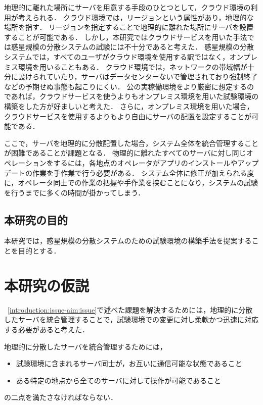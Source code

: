 地理的に離れた場所にサーバを用意する手段のひとつとして，クラウド環境の利用が考えられる．
クラウド環境では，リージョンという属性があり，地理的な場所を指す．
リージョンを指定することで地理的に離れた場所にサーバを設置することが可能である．
しかし，本研究ではクラウドサービスを用いた手法では惑星規模の分散システムの試験には不十分であると考えた．
惑星規模の分散システムでは，すべてのユーザがクラウド環境を使用する訳ではなく，オンプレミス環境を用いることもある．
クラウド環境では，ネットワークの帯域幅が十分に設けられていたり，サーバはデータセンターないで管理されており強制終了などの予期せぬ事態も起こりにくい．
公の実稼働環境をより厳密に想定するのであれば，クラウドサービスを使うよりもオンプレミス環境を用いた試験環境の構築をした方が好ましいと考えた．
さらに，オンプレミス環境を用いた場合，クラウドサービスを使用するよりもより自由にサーバの配置を設定することが可能である．

ここで，サーバを地理的に分散配置した場合，システム全体を統合管理することが困難であることが課題となる．
物理的に離れたすべてのサーバに対し同じオペレーションをするには，各地点のオペレータがアプリのインストールやアップデートの作業を手作業で行う必要がある．
システム全体に修正が加えられる度に，オペレータ同士での作業の把握や手作業を挟むことになり，システムの試験を行うまでに多くの時間が掛かってしまう．

\subsection{本研究の目的}
\label{introduction:issue-aim:aim}

本研究では，惑星規模の分散システムのための試験環境の構築手法を提案することを目的とする．

\section{本研究の仮説}
\label{introduction:hypothesis}

~\ref{introduction:issue-aim:issue}で述べた課題を解決するためには，地理的に分散したサーバを統合管理することで，試験環境での変更に対し柔軟かつ迅速に対応する必要があると考えた．

地理的に分散したサーバを統合管理するためには，
\begin{itemize}
  \item 試験環境に含まれるサーバ同士が，お互いに通信可能な状態であること
  \item ある特定の地点から全てのサーバに対して操作が可能であること
\end{itemize}
の二点を満たさなければならない．

